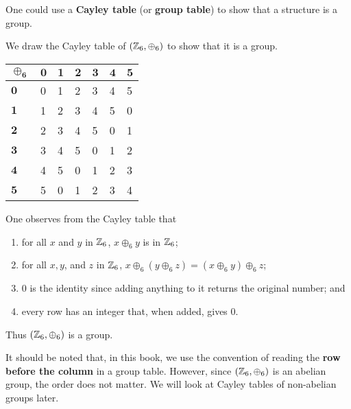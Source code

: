 One could use a \textbf{Cayley table} (or \textbf{group table}) to show that a structure is a group.
\begin{example}
    We draw the Cayley table of $(\mathbb{Z}_6, \oplus_6)$ to show that it is a group.
    \begin{table}[h]
        \centering
        \begin{tabular}{|l|l|l|l|l|l|l|}
        \hline
        $\boldsymbol{\oplus_6}$ & $\boldsymbol{0}$ & $\boldsymbol{1}$ & $\boldsymbol{2}$ & $\boldsymbol{3}$ & $\boldsymbol{4}$ & $\boldsymbol{5}$ \\ \hline
        $\boldsymbol{0}$          & 0          & 1          & 2          & 3          & 4          & 5          \\ \hline
        $\boldsymbol{1}$          & 1          & 2          & 3          & 4          & 5          & 0          \\ \hline
        $\boldsymbol{2}$          & 2          & 3          & 4          & 5          & 0          & 1          \\ \hline
        $\boldsymbol{3}$          & 3          & 4          & 5          & 0          & 1          & 2          \\ \hline
        $\boldsymbol{4}$          & 4          & 5          & 0          & 1          & 2          & 3          \\ \hline
        $\boldsymbol{5}$          & 5          & 0          & 1          & 2          & 3          & 4          \\ \hline
        \end{tabular}
    \end{table}

    One observes from the Cayley table that
    \begin{enumerate}
        \item for all $x$ and $y$ in $\mathbb{Z}_6$, $x \oplus_6 y$ is in $\mathbb{Z}_6$;
        \item for all $x, y$, and $z$ in $\mathbb{Z}_6$, $x \oplus_6 (y \oplus_6 z) = (x \oplus_6 y) \oplus_6 z$;
        \item 0 is the identity since adding anything to it returns the original number; and
        \item every row has an integer that, when added, gives 0.
    \end{enumerate}
    Thus $(\mathbb{Z}_6, \oplus_6)$ is a group.
\end{example}

It should be noted that, in this book, we use the convention of reading the \textbf{row before the column} in a group table. However, since $(\mathbb{Z}_6, \oplus_6)$ is an abelian group, the order does not matter. We will look at Cayley tables of non-abelian groups later.

